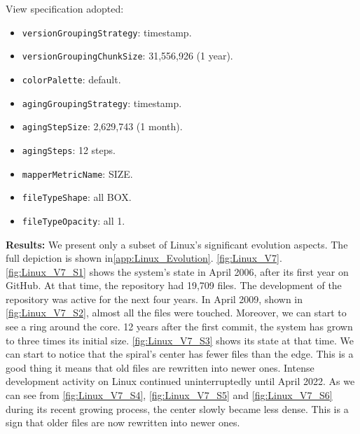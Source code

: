 View specification adopted: 
\begin{itemize}
    \item \texttt{versionGroupingStrategy}: timestamp.
    \item \texttt{versionGroupingChunkSize}: 31,556,926 (1 year). 
    \item \texttt{colorPalette}: default.
    \item \texttt{agingGroupingStrategy}: timestamp.
    \item \texttt{agingStepSize}: 2,629,743 (1 month).
    \item \texttt{agingSteps}: 12 steps.
    \item \texttt{mapperMetricName}: SIZE. 
    \item \texttt{fileTypeShape}: all BOX. 
    \item \texttt{fileTypeOpacity}: all 1. 
\end{itemize}

\textbf{Results:}
We present only a subset of Linux's significant evolution aspects. The full depiction is shown in\autoref{app:Linux_Evolution}. \autoref{fig:Linux_V7}. \autoref{fig:Linux_V7_S1} shows the system's state in April 2006, after its first year on GitHub. At that time, the repository had 19,709 files. The development of the repository was active for the next four years. In April 2009, shown in \autoref{fig:Linux_V7_S2}, almost all the files were touched. Moreover, we can start to see a ring around the core. 
12 years after the first commit, the system has grown to three times its initial size. \autoref{fig:Linux_V7_S3} shows its state at that time. We can start to notice that the spiral's center has fewer files than the edge. This is a good thing it means that old files are rewritten into newer ones. Intense development activity on Linux continued uninterruptedly until April 2022. As we can see from \autoref{fig:Linux_V7_S4}, \autoref{fig:Linux_V7_S5} and \autoref{fig:Linux_V7_S6} during its recent growing process, the center slowly became less dense. This is a sign that older files are now rewritten into newer ones. 


